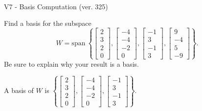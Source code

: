 \begin{exercise}
  \begin{exerciseTitle}V7 - Basis Computation (ver. 325)\end{exerciseTitle}
  \begin{exerciseStatement}
    Find a basis for the subspace 
\[W=\mathrm{span}\ \left\{\left[\begin{array}{r}
2 \\
3 \\
2 \\
0
\end{array}\right] , \left[\begin{array}{r}
-4 \\
-4 \\
-2 \\
0
\end{array}\right] , \left[\begin{array}{r}
-1 \\
3 \\
-1 \\
3
\end{array}\right] , \left[\begin{array}{r}
9 \\
-4 \\
5 \\
-9
\end{array}\right]\right\}.\]
 Be sure to explain why your result is a basis.


  \end{exerciseStatement}
  \begin{exerciseAnswer}
   A basis of \(W\) is  \(\left\{\left[\begin{array}{r}
2 \\
3 \\
2 \\
0
\end{array}\right] , \left[\begin{array}{r}
-4 \\
-4 \\
-2 \\
0
\end{array}\right] , \left[\begin{array}{r}
-1 \\
3 \\
-1 \\
3
\end{array}\right]\right\}\).
  


  \end{exerciseAnswer}
\end{exercise}
